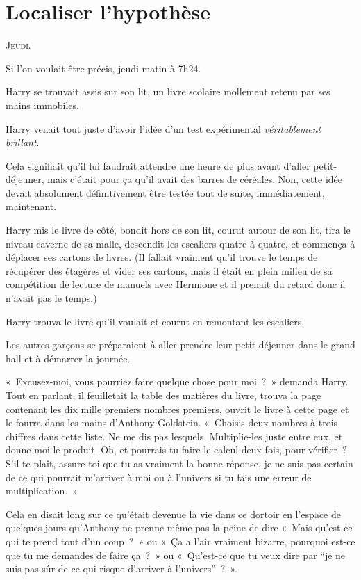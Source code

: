 
\chapter{Localiser l'hypothèse}

\lettrine{J}{eudi}.

\hplettrineextrapara
Si l'on voulait être précis, jeudi matin à 7h24.

Harry se trouvait assis sur son lit, un livre scolaire mollement retenu par ses mains immobiles.

Harry venait tout juste d'avoir l'idée d'un test expérimental \emph{véritablement brillant}.

Cela signifiait qu'il lui faudrait attendre une heure de plus avant d'aller petit-déjeuner, mais c'était pour ça qu'il avait des barres de céréales.
Non, cette idée devait absolument définitivement être testée tout de suite, immédiatement, maintenant.

Harry mis le livre de côté, bondit hors de son lit, courut autour de son lit, tira le niveau caverne de sa malle, descendit les escaliers quatre à quatre, et commença à déplacer ses cartons de livres.
(Il fallait vraiment qu'il trouve le temps de récupérer des étagères et vider ses cartons, mais il était en plein milieu de sa compétition de lecture de manuels avec Hermione et il prenait du retard donc il n'avait pas le temps.)

Harry trouva le livre qu'il voulait et courut en remontant les escaliers.

Les autres garçons se préparaient à aller prendre leur petit-déjeuner dans le grand hall et à démarrer la journée.

«~Excusez-moi, vous pourriez faire quelque chose pour moi~?~» demanda Harry.
Tout en parlant, il feuilletait la table des matières du livre, trouva la page contenant les dix mille premiers nombres premiers, ouvrit le livre à cette page et le fourra dans les mains d'Anthony Goldstein.
«~Choisis deux nombres à trois chiffres dans cette liste.
Ne me dis pas lesquels.
Multiplie-les juste entre eux, et donne-moi le produit.
Oh, et pourrais-tu faire le calcul deux fois, pour vérifier~?
S'il te plaît, assure-toi que tu as vraiment la bonne réponse, je ne suis pas certain de ce qui pourrait m'arriver à moi ou à l'univers si tu fais une erreur de multiplication.~»

Cela en disait long sur ce qu'était devenue la vie dans ce dortoir en l'espace de quelques jours qu'Anthony ne prenne même pas la peine de dire
«~Mais qu'est-ce qui te prend tout d'un coup~?~» ou
«~Ça a l'air vraiment bizarre, pourquoi est-ce que tu me demandes de faire ça~?~» ou
«~Qu'est-ce que tu veux dire par “je ne suis pas sûr de ce qui risque d'arriver à l'univers”~?~».

